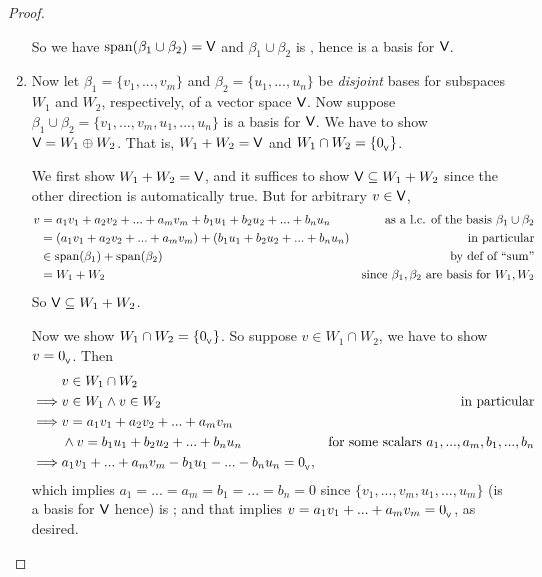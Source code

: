 \begin{proof}
\begin{enumerate}
So we have \(\operatorname{span}(\beta_1 \cup \beta_2) = \textsf{V}\) and \(\beta_1 \cup \beta_2\) is \LID{}, hence is a basis for \(\textsf{V}\).

\item
Now let \(\beta_1 = \{ v_1, ..., v_m \}\) and \(\beta_2 = \{u_1, ..., u_n \}\) be \emph{disjoint} bases for subspaces \(W_1\) and \(W_2\), respectively, of a vector space \(\textsf{V}\).
Now suppose \(\beta_1 \cup \beta_2 = \{ v_1, ..., v_m, u_1, ..., u_n \}\) is a basis for \(\textsf{V}\).
We have to show \(\textsf{V} = W_1 \oplus W_2\).
That is, \(W_1 + W_2 = \textsf{V}\) and \(W_1 \cap W_2 = \{ 0_{_{\textsf{V}}} \}\).

We first show \(W_1 + W_2 = \textsf{V}\), and it suffices to show \(\textsf{V} \subseteq W_1 + W_2\) since the other direction is automatically true.
But for arbitrary \(v \in \textsf{V}\),
\begin{align*}
    v & = a_1 v_1 + a_2 v_2 + ... + a_m v_m + b_1 u_1 + b_2 u_2 + ... + b_n u_n & \text{as a l.c. of the basis \(\beta_1 \cup \beta_2\)} \\
      & = (a_1 v_1 + a_2 v_2 + ... + a_m v_m) + (b_1 u_1 + b_2 u_2 + ... + b_n u_n) & \text{in particular} \\
      & \in \operatorname{span}(\beta_1) + \operatorname{span}(\beta_2) & \text{by def of ``sum''} \\
      & = W_1 + W_2 & \text{since \(\beta_1, \beta_2\) are basis for \(W_1, W_2\)}
\end{align*}
So \(\textsf{V} \subseteq W_1 + W_2\).

Now we show \(W_1 \cap W_2 = \{ 0_{_{\textsf{V}}} \}\).
So suppose \(v \in W_1 \cap W_2\), we have to show \(v = 0_{_{\textsf{V}}}\).
Then
\begin{align*}
             & v \in W_1 \cap W_2 \\
    \implies & v \in W_1 \land v \in W_2 & \text{in particular} \\
    \implies & v = a_1 v_1 + a_2 v_2 + ... + a_m v_m \\
             & \land v = b_1 u_1 + b_2 u_2 + ... + b_n u_n & \text{for some scalars \(a_1, ..., a_m, b_1, ..., b_n\)} \\
    \implies & a_1 v_1 + ... + a_m v_m - b_1 u_1 - ... - b_n u_n = 0_{_{\textsf{V}}},
\end{align*}
which implies \(a_1 = ... = a_m = b_1 = ... = b_n = 0\) since \(\{v_1, ..., v_m, u_1, ..., u_m\}\) (is a basis for \(\textsf{V}\) hence) is \LID{};
and that implies \(v = a_1 v_1 + ... + a_m v_m = 0_{_{\textsf{V}}}\), as desired.
\end{enumerate}
\end{proof}

